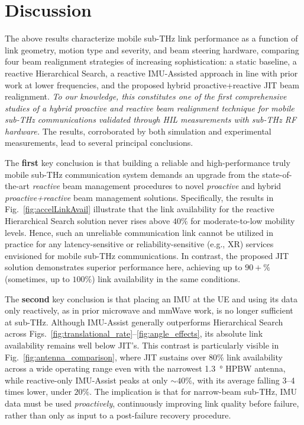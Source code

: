 \documentclass[fleqn,10pt]{wlscirep}
\newcommand{\rev}[1]{{\color{revblue}#1}}
\begin{document}
\section*{Discussion}

The above results characterize mobile sub-THz link performance as a function of link geometry, motion type and severity, and beam steering hardware, comparing four beam realignment strategies of increasing sophistication: a static baseline, a reactive Hierarchical Search, a reactive IMU-Assisted approach in line with prior work at lower frequencies\cite{s141019622, Brambilla_2019}, and the proposed hybrid proactive+reactive JIT beam realignment. \emph{To our knowledge, this constitutes one of the first comprehensive studies of a hybrid proactive and reactive beam realignment technique for mobile sub-THz communications validated through HIL measurements with sub-THz RF hardware.} The results, corroborated by both simulation and experimental measurements, lead to several principal conclusions.

The \textbf{first} key conclusion is that building a reliable and high-performance truly mobile sub-THz communication system demands an upgrade from the state-of-the-art \emph{reactive} beam management procedures to novel \emph{proactive} and hybrid \emph{proactive+reactive} beam management solutions. Specifically, the results in Fig.~\ref{fig:accelLinkAvail} illustrate that the link availability for the reactive Hierarchical Search solution never rises above $40\%$ for moderate-to-low mobility levels. Hence, such an unreliable communication link cannot be utilized in practice for any latency-sensitive or reliability-sensitive (e.g., XR) services envisioned for mobile sub-THz communications. In contrast, the proposed JIT solution demonstrates superior performance here, achieving up to $90+\%$ (sometimes, up to $100\%$) link availability in the same conditions.

\rev{The \textbf{second} key conclusion is that placing an IMU at the UE and using its data only reactively, as in prior microwave and mmWave work, is no longer sufficient at sub-THz. Although IMU-Assist generally outperforms Hierarchical Search across Figs.~\ref{fig:translational_rate}--\ref{fig:angle_effects}, its absolute link availability remains well below JIT's. This contrast is particularly visible in Fig.~\ref{fig:antenna_comparison}, where JIT sustains over $80\%$ link availability across a wide operating range even with the narrowest \SI{1.3}{\degree} HPBW antenna, while reactive-only IMU-Assist peaks at only ${\sim}40\%$, with its average falling 3--4 times lower, under $20\%$. The implication is that for narrow-beam sub-THz, IMU data must be used \emph{proactively}, continuously improving link quality before failure, rather than only as input to a post-failure recovery procedure.}
\end{document}
